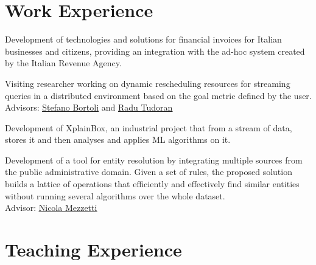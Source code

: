 \documentclass[10pt,a4paper,colorlinks,linkcolor=true]{moderncv}
\newcommand{\cvlink}[2]{\href{#1}{\ul{#2}}}
\begin{document}



\section{Work Experience}

  {Development of technologies and solutions for financial invoices for Italian businesses and citizens, providing an integration with the ad-hoc system created by the Italian Revenue Agency.}

  {Visiting researcher working on dynamic rescheduling resources for streaming queries in a distributed environment based on the goal metric defined by the user.\\
  Advisors: \cvlink{https://www.linkedin.com/in/stefano-bortoli/}{Stefano Bortoli} and \cvlink{https://www.linkedin.com/in/radu-tudoran-37545643/}{Radu Tudoran}}

  {Development of XplainBox, an industrial project that from a stream of data, stores it and then analyses and applies ML algorithms on it.}

  {Development of a tool for entity resolution by integrating multiple sources from the public administrative domain. Given a set of rules, the proposed solution builds a lattice of operations that efficiently and effectively find similar entities without running several algorithms over the whole dataset.\\
  Advisor: \cvlink{https://www.linkedin.com/in/nicolamezzetti/}{Nicola Mezzetti}}


\section{Teaching Experience}
\end{document}

